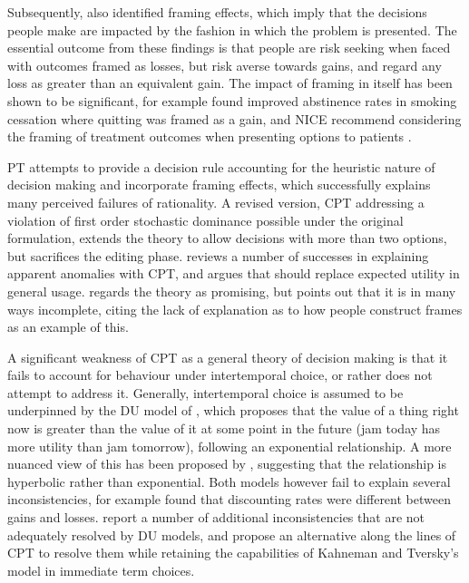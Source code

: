 Subsequently, \citet{Kahneman1984,Tversky1986} also identified framing
effects, which imply that the decisions people make are impacted by
the fashion in which the problem is presented. The essential outcome
from these findings is that people are risk seeking when faced with
outcomes framed as losses, but risk averse towards gains, and regard
any loss as greater than an equivalent gain. The impact of framing
in itself has been shown to be significant, for example \citet{Toll2007}
found improved abstinence rates in smoking cessation where quitting
was framed as a gain, and \ac{NICE} recommend considering the framing
of treatment outcomes when presenting options to patients \citep{NICE2007}.

\ac{PT} \citep{Kahneman1979} attempts to provide a decision rule
accounting for the heuristic nature of decision making and incorporate
framing effects, which successfully explains many perceived failures
of rationality. A revised version, \ac{CPT} \citep{Tversky1992}
addressing a violation of first order stochastic dominance possible
under the original formulation, extends the theory to allow decisions
with more than two options, but sacrifices the editing phase. \citet{Camerer2004a}
reviews a number of successes in explaining apparent anomalies with
\ac{CPT}, and argues that should replace expected utility in general
usage. \citet{Thaler2000} regards the theory as promising, but points
out that it is in many ways incomplete, citing the lack of explanation
as to how people construct frames as an example of this.

A significant weakness of \ac{CPT} as a general theory of decision
making is that it fails to account for behaviour under intertemporal
choice, or rather does not attempt to address it. Generally, intertemporal
choice is assumed to be underpinned by the \ac{DU} model of \citet{Samuelson1937},
which proposes that the value of a thing right now is greater than
the value of it at some point in the future (jam today has more utility
than jam tomorrow), following an exponential relationship. A more
nuanced view of this has been proposed by \citet{Ainslie1991}, suggesting
that the relationship is hyperbolic rather than exponential. Both
models however fail to explain several inconsistencies, for example
\citet{Thaler1981} found that discounting rates were different between
gains and losses. \citet{Loewenstein1992} report a number of additional
inconsistencies that are not adequately resolved by \ac{DU} models,
and propose an alternative along the lines of \ac{CPT} to resolve
them while retaining the capabilities of Kahneman and Tversky's model
in immediate term choices.
